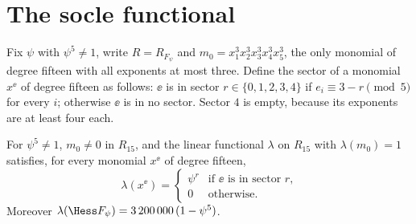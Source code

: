 \section{The socle functional}\label{sec:socle}

Fix $\psi$ with $\psi^5\ne1$, write $R=R_{F_\psi}$ and $m_0=x_1^3x_2^3
x_3^3x_4^3x_5^3$, the only monomial of degree fifteen with all exponents at
most three. Define the sector of a monomial $x^{\ee}$ of degree fifteen as
follows: $\ee$ is in sector $r\in\{0,1,2,3,4\}$ if $e_i\equiv 3-r\pmod5$
for every $i$; otherwise $\ee$ is in no sector. Sector $4$ is empty, because
its exponents are at least four each.

\begin{theorem}\label{thm:socle}
For $\psi^5\ne1$, $m_0\ne0$ in $R_{15}$, and the linear functional
$\lambda$ on $R_{15}$ with $\lambda(m_0)=1$ satisfies, for every monomial
$x^{\ee}$ of degree fifteen,
\[
\lambda(x^{\ee})=\begin{cases}\psi^{r}&\text{if $\ee$ is in sector $r$,}\\
0&\text{otherwise.}\end{cases}
\]
Moreover $\lambda(\Hess F_\psi)=3\,200\,000\,(1-\psi^5)$.
\end{theorem}

